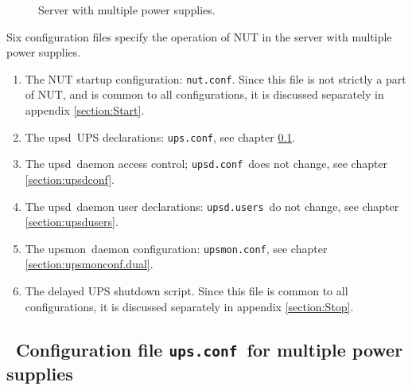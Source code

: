 \documentclass[12pt]{article}
\newlength{\headersep}\setlength{\headersep}{3mm}
\newcommand{\Hsep}{\hspace{\headersep}}
\newcommand{\upsd}{\mbox{\textcolor{UPSDCOLOUR}{upsd}}}
\newcommand{\upsmon}{\mbox{\textcolor{MONCOLOUR}{upsmon}}}
\newcommand{\nutconf}{\textcolor{NUTCOLOUR}{\texttt{nut.conf}}}
\newcommand{\upsconf}{\textcolor{UPSDCOLOUR}{\texttt{ups.conf}}}
\newcommand{\upsdconf}{\textcolor{UPSDCOLOUR}{\texttt{upsd.conf}}}
\newcommand{\upsdusers}{\textcolor{UPSDCOLOUR}{\texttt{upsd.users}}}
\newcommand{\upsmonconf}{\textcolor{MONCOLOUR}{\texttt{upsmon.conf}}}
\newcommand{\ol}{\begin{enumerate}%
   \setlength{\itemsep}{0em}}
\newcommand{\eol}{\end{enumerate}}
\newcommand{\li}{\item}                 %
\newcommand{\refpage}[1]{\ref{#1}}
\begin{document}
\begin{figure}[ht]
\begin{center}
\end{center}
\vspace{-6mm}
\caption{Server with multiple power supplies.\label{fig:dual}}
\end{figure}

Six configuration files specify the operation of NUT in the server with multiple
power supplies.

\ol

\li The NUT startup configuration: \nutconf.  Since this file is not strictly
a part of NUT, and is common to all configurations, it is discussed separately
in appendix \refpage{section:Start}.

\li The \upsd\ UPS declarations: \upsconf, see chapter \ref{section:upsconf.dual}.

\li The \upsd\ daemon access control; \upsdconf\ does not change, see chapter
\ref{section:upsdconf}.

\li The \upsd\ daemon user declarations: \upsdusers\ do not change, see chapter
\ref{section:upsdusers}.

\li The \upsmon\ daemon configuration: \upsmonconf, see chapter
\ref{section:upsmonconf.dual}.

\li The delayed UPS shutdown script.  Since this file is common to all
configurations, it is discussed separately in appendix \refpage{section:Stop}.

\eol


\subsection{\Hsep\ Configuration file \upsconf\ for multiple power supplies}\label{section:upsconf.dual}
\end{document}
